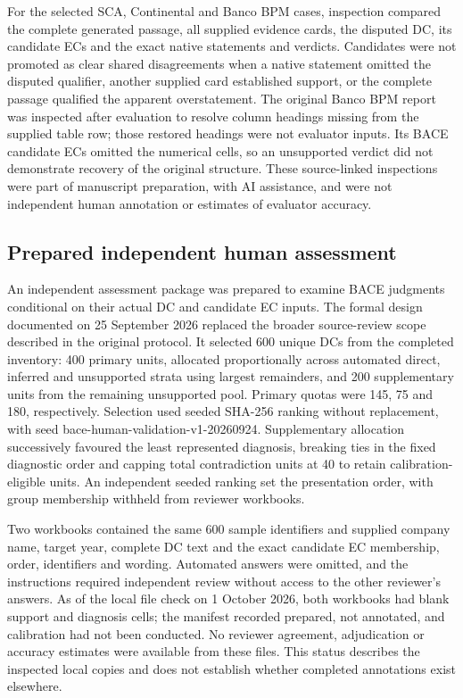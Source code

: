 \documentclass[11pt,a4paper]{article}
\begin{document}
For the selected SCA, Continental and Banco BPM cases, inspection compared the complete generated passage, all supplied evidence cards, the disputed DC, its candidate ECs and the exact native statements and verdicts. Candidates were not promoted as clear shared disagreements when a native statement omitted the disputed qualifier, another supplied card established support, or the complete passage qualified the apparent overstatement. The original Banco BPM report was inspected after evaluation to resolve column headings missing from the supplied table row; those restored headings were not evaluator inputs. Its BACE candidate ECs omitted the numerical cells, so an unsupported verdict did not demonstrate recovery of the original structure. These source-linked inspections were part of manuscript preparation, with AI assistance, and were not independent human annotation or estimates of evaluator accuracy.

\subsection*{Prepared independent human assessment}

An independent assessment package was prepared to examine BACE judgments conditional on their actual DC and candidate EC inputs. The formal design documented on 25 September 2026 replaced the broader source-review scope described in the original protocol. It selected 600 unique DCs from the completed inventory: 400 primary units, allocated proportionally across automated direct, inferred and unsupported strata using largest remainders, and 200 supplementary units from the remaining unsupported pool. Primary quotas were 145, 75 and 180, respectively. Selection used seeded SHA-256 ranking without replacement, with seed bace-human-validation-v1-20260924. Supplementary allocation successively favoured the least represented diagnosis, breaking ties in the fixed diagnostic order and capping total contradiction units at 40 to retain calibration-eligible units. An independent seeded ranking set the presentation order, with group membership withheld from reviewer workbooks.

Two workbooks contained the same 600 sample identifiers and supplied company name, target year, complete DC text and the exact candidate EC membership, order, identifiers and wording. Automated answers were omitted, and the instructions required independent review without access to the other reviewer's answers. As of the local file check on 1 October 2026, both workbooks had blank support and diagnosis cells; the manifest recorded prepared, not annotated, and calibration had not been conducted. No reviewer agreement, adjudication or accuracy estimates were available from these files. This status describes the inspected local copies and does not establish whether completed annotations exist elsewhere.
\end{document}
